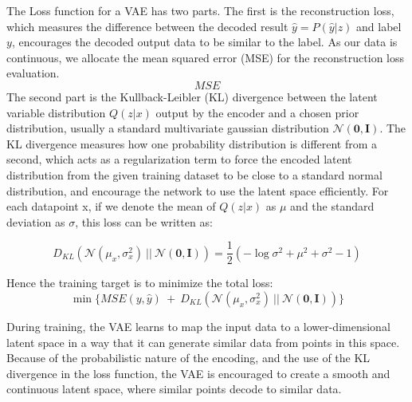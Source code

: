 The Loss function for a VAE has two parts. The first is the reconstruction loss, which measures the difference between the decoded result $\hat{y} = P(\hat{y}|z)$ and label $y$, encourages the decoded output data to be similar to the label. As our data is continuous, we allocate the mean squared error (MSE) for the reconstruction loss evaluation.
\begin{equation}
	\label{eq:vae_MSE_loss}
	\textit{MSE}
\end{equation}
The second part is the Kullback-Leibler (KL) divergence between the latent variable distribution $Q(z|x)$ output by the encoder and a chosen prior distribution, usually a standard multivariate gaussian distribution $\mathcal{N}(\textbf{0}, \textbf{I})$. The KL divergence measures how one probability distribution is different from a second, which acts as a regularization term to force the encoded latent distribution from the given training dataset to be close to a standard normal distribution, and encourage the network to use the latent space efficiently. 
For each datapoint x, if we denote the mean of $Q(z|x)$ as $\mu$ and the standard deviation as $\sigma$, this loss can be written as:

\begin{equation}
	\label{eq:vae_KLD_loss}
	D_{KL}( \mathcal{N}(\mu_{x}, \sigma_{x}^{2}) ~ || ~ \mathcal{N}(\textbf{0}, \textbf{I} ) )  = \dfrac{1}{2} (-\log\sigma^{2} + \mu^{2} + \sigma^{2} - 1)
\end{equation}

Hence the training target is to minimize the total loss:
\begin{equation}
	\label{eq:vae_total_loss}
	\min  \{  \textit{MSE} (y , \hat{y} )   ~ + ~  D_{KL}( \mathcal{N}(\mu_{x}, \sigma_{x}^{2}) ~ || ~ \mathcal{N}(\textbf{0}, \textbf{I} ) )  \}
\end{equation}

During training, the VAE learns to map the input data to a lower-dimensional latent space in a way that it can generate similar data from points in this space. Because of the probabilistic nature of the encoding, and the use of the KL divergence in the loss function, the VAE is encouraged to create a smooth and continuous latent space, where similar points decode to similar data.






